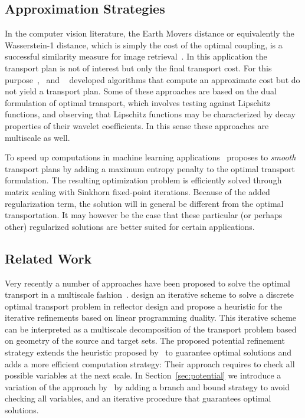 \documentclass[twoside,11pt]{article}
\begin{document}
\subsection{Approximation Strategies}
In the computer vision literature, the Earth Movers distance or equivalently the
Wasserstein-1 distance, which is simply the cost of the optimal coupling, is
a successful similarity measure for image retrieval~\citep{rubner:iccv1998}. In
this application the transport plan is not of interest but only the final
transport cost.  For this
purpose~\citet{indyk2003fast},~\citet{shirdhonkar:cvpr2008} and
~\citet{andoni:soda2008} developed algorithms that compute an approximate cost
but do not yield a transport plan.  Some of these approaches are based on the
dual formulation of optimal transport, which involves testing against Lipschitz
functions, and observing that Lipschitz functions may be characterized by decay
properties of their wavelet coefficients. In this sense these approaches
are multiscale as well.

To speed up computations in machine learning
applications~\citet{cuturi:nips2013} proposes to {\em smooth} transport plans by
adding a maximum entropy penalty to the  optimal transport formulation. The
resulting optimization problem is efficiently solved through matrix scaling
with Sinkhorn fixed-point iterations.  Because of the added regularization
term, the solution will in general be different from the optimal
transportation. It may however be the case that these particular (or
perhaps other) regularized solutions are better suited for certain
applications.


\subsection{Related Work}
Very recently a number of approaches have been proposed to solve the optimal
transport in a multiscale
fashion~\citep{glimm:arxiv2011,schmitzer2013hierarchical,schmitzer2015sparse,oberman2015efficient}.
\citet{glimm:arxiv2011} design an iterative scheme to solve a discrete optimal
transport problem in reflector design and propose a heuristic for the iterative
refinements based on linear programming duality. This iterative scheme can be
interpreted as a multiscale decomposition of the transport problem based on
geometry of the source and target sets. The proposed potential refinement
strategy extends the heuristic proposed by~\citet{glimm:arxiv2011} to guarantee
optimal solutions and adds a more efficient computation strategy:  Their
approach requires to check all possible variables at the next scale. In
Section~\ref{sec:potential} we introduce a variation of the approach
by~\citet{glimm:arxiv2011} by adding a branch and bound strategy to avoid
checking all variables, and an iterative procedure that guarantees optimal
solutions.  
\end{document}
